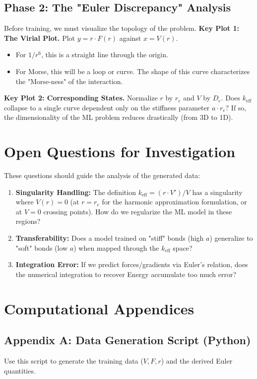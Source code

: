 \documentclass[11pt, a4paper]{article}
\begin{document}
\subsection{Phase 2: The "Euler Discrepancy" Analysis}
Before training, we must visualize the topology of the problem.
\textbf{Key Plot 1: The Virial Plot.} Plot $y = r \cdot F(r)$ against $x = V(r)$.
\begin{itemize}
    \item For $1/r^6$, this is a straight line through the origin.
    \item For Morse, this will be a loop or curve. The shape of this curve characterizes the "Morse-ness" of the interaction.
\end{itemize}

\textbf{Key Plot 2: Corresponding States.} Normalize $r$ by $r_e$ and $V$ by $D_e$. Does $k_{\text{eff}}$ collapse to a single curve dependent only on the stiffness parameter $a \cdot r_e$? If so, the dimensionality of the ML problem reduces drastically (from 3D to 1D).

\section{Open Questions for Investigation}
These questions should guide the analysis of the generated data:
\begin{enumerate}
    \item \textbf{Singularity Handling:} The definition $k_{\text{eff}} = (r \cdot V')/V$ has a singularity where $V(r)=0$ (at $r=r_e$ for the harmonic approximation formulation, or at $V=0$ crossing points). How do we regularize the ML model in these regions?
    \item \textbf{Transferability:} Does a model trained on "stiff" bonds (high $a$) generalize to "soft" bonds (low $a$) when mapped through the $k_{\text{eff}}$ space?
    \item \textbf{Integration Error:} If we predict forces/gradients via Euler's relation, does the numerical integration to recover Energy accumulate too much error?
\end{enumerate}

\section{Computational Appendices}

\subsection{Appendix A: Data Generation Script (Python)}
Use this script to generate the training data ($V, F, r$) and the derived Euler quantities.
\end{document}

